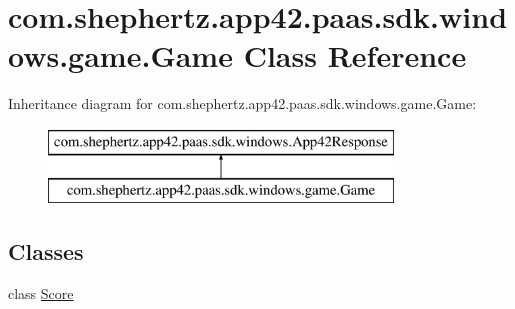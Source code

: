 \hypertarget{classcom_1_1shephertz_1_1app42_1_1paas_1_1sdk_1_1windows_1_1game_1_1_game}{\section{com.\+shephertz.\+app42.\+paas.\+sdk.\+windows.\+game.\+Game Class Reference}
\label{classcom_1_1shephertz_1_1app42_1_1paas_1_1sdk_1_1windows_1_1game_1_1_game}
}
Inheritance diagram for com.\+shephertz.\+app42.\+paas.\+sdk.\+windows.\+game.\+Game\+:\begin{figure}[H]
\begin{center}
\leavevmode
\includegraphics[height=2.000000cm]{classcom_1_1shephertz_1_1app42_1_1paas_1_1sdk_1_1windows_1_1game_1_1_game}
\end{center}
\end{figure}
\subsection*{Classes}
\begin{DoxyCompactItemize}
\item 
class \hyperlink{classcom_1_1shephertz_1_1app42_1_1paas_1_1sdk_1_1windows_1_1game_1_1_game_1_1_score}{Score}
\end{DoxyCompactItemize}
